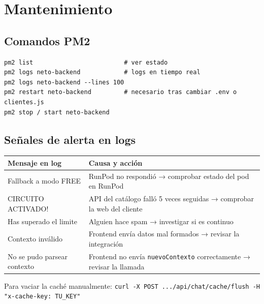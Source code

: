 \documentclass[12pt, a4paper]{article}
\begin{document}
\section{Mantenimiento}

\subsection{Comandos PM2}

\begin{lstlisting}[style=bash]
pm2 list                         # ver estado
pm2 logs neto-backend            # logs en tiempo real
pm2 logs neto-backend --lines 100
pm2 restart neto-backend         # necesario tras cambiar .env o clientes.js
pm2 stop / start neto-backend
\end{lstlisting}

\subsection{Señales de alerta en logs}

\begin{center}
\renewcommand{\arraystretch}{1.3}
\begin{tabularx}{\textwidth}{>{\ttfamily\footnotesize\raggedright\arraybackslash}p{5.8cm} >{\raggedright\arraybackslash}X}
\toprule
\textbf{Mensaje en log} & \textbf{Causa y acción} \\
\midrule
Fallback a modo FREE            & RunPod no respondió → comprobar estado del pod en RunPod \\
CIRCUITO ACTIVADO!              & API del catálogo falló 5 veces seguidas → comprobar la web del cliente \\
Has superado el limite          & Alguien hace spam → investigar si es continuo \\
Contexto inválido               & Frontend envía datos mal formados → revisar la integración \\
No se pudo parsear contexto     & Frontend no envía \normalfont\texttt{nuevoContexto} correctamente → revisar la llamada \\
\bottomrule
\end{tabularx}
\end{center}

Para vaciar la caché manualmente: \quad \verb|curl -X POST .../api/chat/cache/flush -H "x-cache-key: TU_KEY"|
\end{document}
